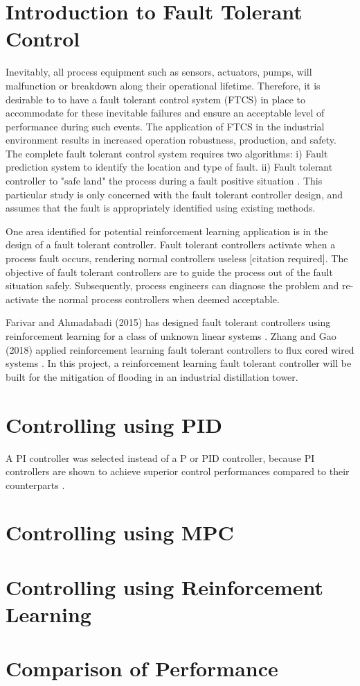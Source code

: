 \section{Introduction to Fault Tolerant Control}

Inevitably, all process equipment such as sensors, actuators, pumps, will malfunction or breakdown along their operational lifetime. Therefore, it is desirable to to have a fault tolerant control system (FTCS) in place to accommodate for these inevitable failures and ensure an acceptable level of performance during such events. The application of FTCS in the industrial environment results in increased operation robustness, production, and safety. The complete fault tolerant control system requires two algorithms: i) Fault prediction system to identify the location and type of fault. ii) Fault tolerant controller to "safe land" the process during a fault positive situation \cite{process_faults}.  This particular study is only concerned with the fault tolerant controller design, and assumes that the fault is appropriately identified using existing methods.

One area identified for potential reinforcement learning application is in the design of a fault tolerant controller.  Fault tolerant controllers activate when a process fault occurs, rendering normal controllers useless [citation required]. The objective of fault tolerant controllers are to guide the process out of the fault situation safely.  Subsequently, process engineers can diagnose the problem and re-activate the normal process controllers when deemed acceptable.  

Farivar and Ahmadabadi (2015) has designed fault tolerant controllers using reinforcement learning for a class of unknown linear systems \cite{ahmad}.  Zhang and Gao (2018) applied reinforcement learning fault tolerant controllers to flux cored wired systems \cite{zhang_gao}.  In this project, a reinforcement learning fault tolerant controller will be built for the mitigation of flooding in an industrial distillation tower. 

\section{Controlling using PID}
A PI controller was selected instead of a P or PID controller, because PI controllers are shown to achieve superior control performances compared to their counterparts \cite{PI_controller}.

\section{Controlling using MPC}
\section{Controlling using Reinforcement Learning}
\section{Comparison of Performance}